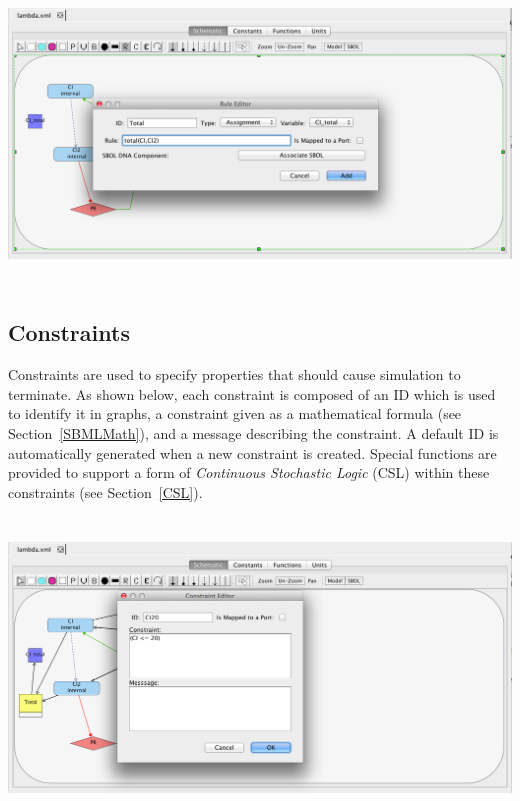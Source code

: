 \documentclass[titlepage,11pt]{article}
\begin{document}
\begin{center}
\includegraphics[height=80mm]{screenshots/rule}
\end{center}

\subsection{\label{Constraints}Constraints}

\noindent
Constraints are used to specify properties that should cause simulation to terminate.  As shown below, each constraint is composed of an ID which is used to identify it in graphs, a constraint given as a mathematical formula (see Section~\ref{SBMLMath}), and a message describing the constraint.  A default ID is automatically generated when a new constraint is created.
Special functions are provided to support a form of \emph{Continuous Stochastic Logic} (CSL) within these constraints (see Section~\ref{CSL}).  

\begin{center}
\includegraphics[height=80mm]{screenshots/constraint}
\end{center}
\end{document}
